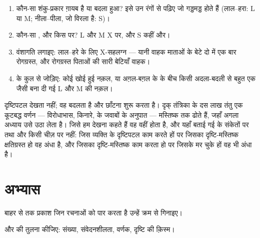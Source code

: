 \begin{method}[रंग-दृष्टि के किसी मामले पर तर्क करना]\label{met:g11:the-eye:case}
\begin{enumerate}
  \item कौन-सा शंकु-प्रकार ग़ायब है या बदला हुआ? इसे उन रंगों से पढ़िए जो
        गड्डमड्ड होते हैं (लाल--हरा: L या M; नीला--पीला, जो विरला है: S)।
  \item कौन-सा , और किस  पर? L और M X पर, और S कहीं और।
  \item वंशागति लगाइए: लाल--हरे के लिए X-सहलग्न  --- यानी वाहक
        माताओं के बेटे दो में एक बार रोगग्रस्त, और रोगग्रस्त पिताओं की सारी
        बेटियाँ वाहक।
  \item {} के कुल से जोड़िए: कोई खोई हुई नक़ल, या अग़ल-बग़ल के  के
        बीच किसी अदला-बदली से बहुत एक जैसी बना दी गई L और M की नक़ल।
\end{enumerate}
\end{method}

\begin{remark}[आँख से मस्तिष्क तक]\label{rem:g11:the-eye:tobrain}
दृष्टिपटल देखता नहीं; वह बदलता है और छाँटना शुरू करता है। दृक् तंत्रिका के
दस लाख तंतु एक कूटबद्ध वर्णन --- विरोधाभास, किनारे,  के जवाबों के
अनुपात --- मस्तिष्क तक ढोते हैं, जहाँ अगला अध्याय उसे उठा लेता है। जिसे हम
देखना कहते हैं वह वहीं होता है, और यहाँ बताई गई  के संकेतों पर तथा
और किसी चीज़ पर नहीं: जिस व्यक्ति के दृष्टिपटल काम करते हों पर जिसका
दृष्टि-मस्तिष्क क्षतिग्रस्त हो वह अंधा है, और जिसका दृष्टि-मस्तिष्क काम
करता हो पर जिसके  मर चुके हों वह भी अंधा है।
\end{remark}

\section{अभ्यास}

\begin{exercise}[$\star$]\label{exo:g11:the-eye:1}
बाहर से  तक प्रकाश जिन रचनाओं को पार करता है उन्हें क्रम से
गिनाइए।
\end{exercise}

\begin{exercise}[$\star$]\label{exo:g11:the-eye:2}
 और  की तुलना कीजिए: संख्या, संवेदनशीलता, वर्णक, दृष्टि की
क़िस्म।
\end{exercise}

